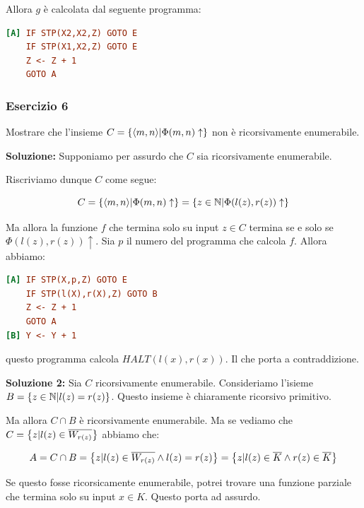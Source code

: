 Allora \(g\) è calcolata dal seguente programma:

\begin{lstlisting}[language=ini, caption={ }]
[A] IF STP(X2,X2,Z) GOTO E
    IF STP(X1,X2,Z) GOTO E
    Z <- Z + 1
    GOTO A
\end{lstlisting}

\newpage
\subsubsection{Esercizio 6}

Mostrare che l'insieme \(C=\displaystyle{\left\{{\displaystyle{\left\langle{m,n}\right\rangle} \vert \Phi(m,n) \uparrow}\right\}}\) non è ricorsivamente enumerabile.

\textbf{Soluzione: } Supponiamo per assurdo che \(C\) sia ricorsivamente enumerabile.

Riscriviamo dunque \(C\) come segue:

\begin{equation}
  C=\displaystyle{\left\{{\displaystyle{\left\langle{m,n}\right\rangle} \vert \Phi(m,n) \uparrow}\right\}}=\displaystyle{\left\{{z \in \mathbb{N}\vert \Phi(l(z),r(z)) \uparrow}\right\}}
\end{equation}

Ma allora la funzione \(f\) che termina solo su input \(z \in C\) termina se e solo se \(\Phi(l(z),r(z)) \uparrow\). Sia \(p\) il numero del programma che calcola \(f\). Allora abbiamo:

\begin{lstlisting}[language=ini, caption={ }]
[A] IF STP(X,p,Z) GOTO E
    IF STP(l(X),r(X),Z) GOTO B
    Z <- Z + 1
    GOTO A
[B] Y <- Y + 1
\end{lstlisting}

questo programma calcola \(HALT(l(x), r(x))\). Il che porta a contraddizione.

\textbf{Soluzione 2: } Sia \(C\) ricorsivamente enumerabile. Consideriamo l'isieme \(B=\displaystyle{\left\{{z \in \mathbb{N}\vert l(z) = r(z)}\right\}}\). Questo insieme è chiaramente ricorsivo primitivo.

Ma allora \(C \cap B\) è ricorsivamente enumerabile. Ma se vediamo che \(C=\displaystyle{\left\{{z \vert l(z) \in \overline{W_{r(z)}}}\right\}}\) abbiamo che:

\begin{equation}
  A = C \cap B = \displaystyle{\left\{{z \vert l(z) \in \overline{W_{r(z)}} \land l(z) = r(z)}\right\}} = \displaystyle{\left\{{z \vert l(z) \in \overline{K} \land r(z) \in \overline{K}}\right\}}
\end{equation}

Se questo fosse ricorsicamente enumerabile, potrei trovare una funzione parziale che termina solo su input \(x \in K\). Questo porta ad assurdo.

